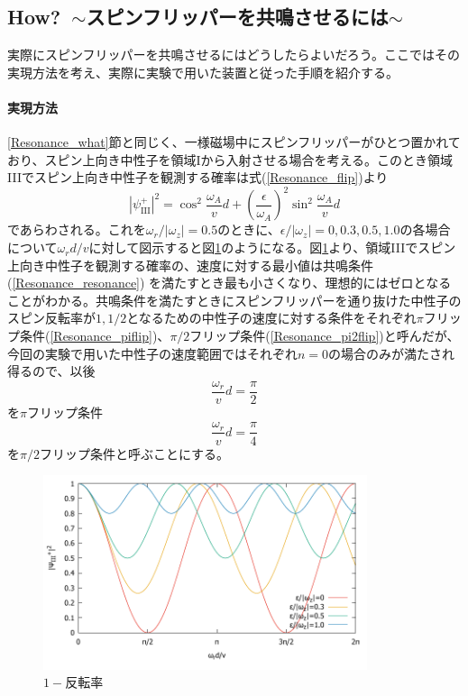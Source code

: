 \clearpage
\subsection{How?\ $\sim$スピンフリッパーを共鳴させるには$\sim$}
実際にスピンフリッパーを共鳴させるにはどうしたらよいだろう。ここではその実現方法を考え、実際に実験で用いた装置と従った手順を紹介する。

\paragraph{実現方法}
\ref{Resonance_what}節と同じく、一様磁場中にスピンフリッパーがひとつ置かれており、スピン上向き中性子を領域Iから入射させる場合を考える。このとき領域IIIでスピン上向き中性子を観測する確率は式(\ref{Resonance_flip})より
\begin{equation}
|\psi_\mathrm{III}^+|^2 =\cos^2 \frac{\omega_A}{v}d+\left(\frac{\epsilon}{\omega_A}\right)^2\sin^2\frac{\omega_A}{v}d
\end{equation}
であらわされる。これを$\omega_r/|\omega_z|=0.5$のときに、$\epsilon/|\omega_z|=0,0.3,0.5,1.0$の各場合について$\omega_r d/v$に対して図示すると図\ref{Resonance_fig_1-reversal}のようになる。図\ref{Resonance_fig_1-reversal}より、領域IIIでスピン上向き中性子を観測する確率の、速度に対する最小値は共鳴条件(\ref{Resonance_resonance})
を満たすとき最も小さくなり、理想的にはゼロとなることがわかる。共鳴条件を満たすときにスピンフリッパーを通り抜けた中性子のスピン反転率が$1,1/2$となるための中性子の速度に対する条件をそれぞれ$\pi$フリップ条件(\ref{Resonance_piflip})、$\pi/2$フリップ条件(\ref{Resonance_pi2flip})と呼んだが、今回の実験で用いた中性子の速度範囲ではそれぞれ$n=0$の場合のみが満たされ得るので、以後
\begin{equation}
\frac{\omega_r}{v}d=\frac{\pi}{2}\label{Resonance_piflip}
\end{equation}
を$\pi$フリップ条件
\begin{equation}
\frac{\omega_r}{v}d=\frac{\pi}{4}\label{Resonance_pi2flip}
\end{equation}
を$\pi/2$フリップ条件と呼ぶことにする。
\begin{figure}[h]
\begin{center}
\includegraphics[width=9.5cm]{resonance/whatwhyhow/resonance_1-reversal.pdf}
\caption{$1-反転率$}
\label{Resonance_fig_1-reversal}
\end{center}
\end{figure}

